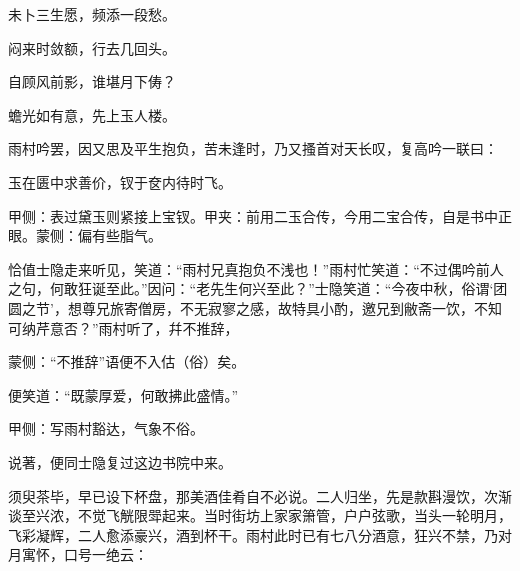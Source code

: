 \begin{poem}
    \begin{pl}未卜三生愿，频添一段愁。\end{pl}

    \begin{pl}闷来时敛额，行去几回头。\end{pl}

    \begin{pl}自顾风前影，谁堪月下俦？\end{pl}

    \begin{pl}蟾光如有意，先上玉人楼。\end{pl}
\end{poem}


\begin{parag}
    雨村吟罢，因又思及平生抱负，苦未逢时，乃又搔首对天长叹，复高吟一联曰：
\end{parag}


\begin{poem}
    \begin{pl}玉在匮中求善价，钗于奁内待时飞。\begin{note}甲侧：表过黛玉则紧接上宝钗。甲夹：前用二玉合传，今用二宝合传，自是书中正眼。蒙侧：偏有些脂气。\end{note}\end{pl}\end{poem}


\begin{parag}
    恰值士隐走来听见，笑道：“雨村兄真抱负不浅也！”雨村忙笑道：“不过偶吟前人之句，何敢狂诞至此。”因问：“老先生何兴至此？”士隐笑道：“今夜中秋，俗谓‘团圆之节’，想尊兄旅寄僧房，不无寂寥之感，故特具小酌，邀兄到敝斋一饮，不知可纳芹意否？”雨村听了，幷不推辞，\begin{note}蒙侧：“不推辞”语便不入估（俗）矣。\end{note}便笑道：“既蒙厚爱，何敢拂此盛情。”\begin{note}甲侧：写雨村豁达，气象不俗。\end{note}说著，便同士隐复过这边书院中来。
\end{parag}


\begin{parag}
    须臾茶毕，早已设下杯盘，那美酒佳肴自不必说。二人归坐，先是款斟漫饮，次渐谈至兴浓，不觉飞觥限斝起来。当时街坊上家家箫管，户户弦歌，当头一轮明月，飞彩凝辉，二人愈添豪兴，酒到杯干。雨村此时已有七八分酒意，狂兴不禁，乃对月寓怀，口号一绝云：
\end{parag}



